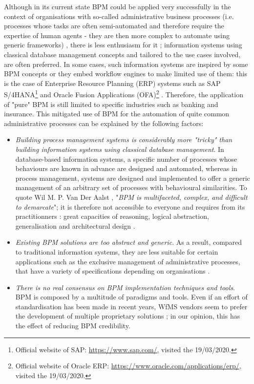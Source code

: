 Although in its current state BPM could be applied very successfully in the context of organisations with so-called administrative business processes (i.e. processes whose tasks are often semi-automated and therefore require the expertise of human agents - they are then more complex to automate using generic frameworks) \cite{boukhedouma2015adaptation}, there is less enthusiasm for it \cite{dumas2015models, van2016don}; information systems using classical database management concepts and tailored to the use cases involved, are often preferred. In some cases, such information systems are inspired by some BPM concepts or they embed workflow engines to make limited use of them: this is the case of Enterprise Resource Planning (ERP) systems such as SAP S/4HANA\footnote{Official website of SAP: \url{https://www.sap.com/}, visited the 19/03/2020.} and Oracle Fusion Applications (OFA)\footnote{Official website of Oracle ERP: \url{https://www.oracle.com/applications/erp/}, visited the 19/03/2020.} \cite{van2016don, van2013business}. Therefore, the application of "pure" BPM is still limited to specific industries such as banking and insurance. This mitigated use of BPM for the automation of quite common administrative processes can be explained by the following factors:
\begin{itemize}
	\item \textit{Building process management systems is considerably more "tricky" than building information systems using classical database management}. In database-based information systems, a specific number of processes whose behaviours are known in advance are designed and automated, whereas in process management, systems are designed and implemented to offer a generic management of an arbitrary set of processes with behavioural similarities. To quote Wil M. P. Van Der Aalst \citeyearpar{van2013business}, "\textit{BPM is multifaceted, complex, and difficult to demarcate}"; it is therefore not accessible to everyone and requires from its practitionners : great capacities of reasoning, logical abstraction, generalisation and architectural design \cite{workflow95}.
	\item \textit{Existing BPM solutions are too abstract and generic}. As a result, compared to traditional information systems, they are less suitable for certain applications such as the exclusive management of administrative processes, that have a variety of specifications depending on organisations \cite{borger2012approaches, zur2013much, van2013business}.
	\item \textit{There is no real consensus on BPM implementation techniques and tools}. BPM is composed by a multitude of paradigms and tools. Even if an effort of standardisation has been made in recent years, WfMS vendors seem to prefer the development of multiple proprietary solutions \cite{van2013business}; in our opinion, this has the effect of reducing BPM credibility.
\end{itemize} 

